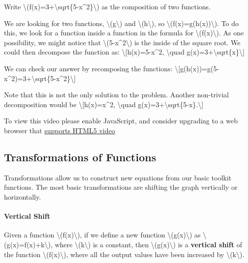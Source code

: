 Write
\textbackslash{}(f(x)=3+\textbackslash{}sqrt\{5-x\^{}2\}\textbackslash{})
as the composition of two functions.

We are looking for two functions, \textbackslash{}(g\textbackslash{})
and \textbackslash{}(h\textbackslash{}), so
\textbackslash{}(f(x)=g(h(x))\textbackslash{}). To do this, we look for
a function inside a function in the formula for
\textbackslash{}(f(x)\textbackslash{}). As one possibility, we might
notice that \textbackslash{}(5-x\^{}2\textbackslash{}) is the inside of
the square root. We could then decompose the function as:
\textbackslash{}{[}h(x)=5-x\^{}2, \textbackslash{}quad
g(x)=3+\textbackslash{}sqrt\{x\}\textbackslash{}{]}

We can check our answer by recomposing the functions:
\textbackslash{}{[}g(h(x))=g(5-x\^{}2)=3+\textbackslash{}sqrt\{5-x\^{}2\}\textbackslash{}{]}

Note that this is not the only solution to the problem. Another
non-trivial decomposition would be \textbackslash{}{[}h(x)=x\^{}2,
\textbackslash{}quad
g(x)=3+\textbackslash{}sqrt\{5-x\}.\textbackslash{}{]}

To view this video please enable JavaScript, and consider upgrading to a
web browser that \href{http://videojs.com/html5-video-support/}{supports
HTML5 video}

\hypertarget{transformations-of-functions}{%
\subsection{Transformations of
Functions}\label{transformations-of-functions}}

Transformations allow us to construct new equations from our basic
toolkit functions. The most basic transformations are shifting the graph
vertically or horizontally.

\hypertarget{vertical-shift}{%
\paragraph{Vertical Shift}\label{vertical-shift}}

Given a function \textbackslash{}(f(x)\textbackslash{}), if we define a
new function \textbackslash{}(g(x)\textbackslash{}) as
\textbackslash{}(g(x)=f(x)+k\textbackslash{}), where
\textbackslash{}(k\textbackslash{}) is a constant, then
\textbackslash{}(g(x)\textbackslash{}) is a \textbf{vertical shift} of
the function \textbackslash{}(f(x)\textbackslash{}), where all the
output values have been increased by
\textbackslash{}(k\textbackslash{}).

